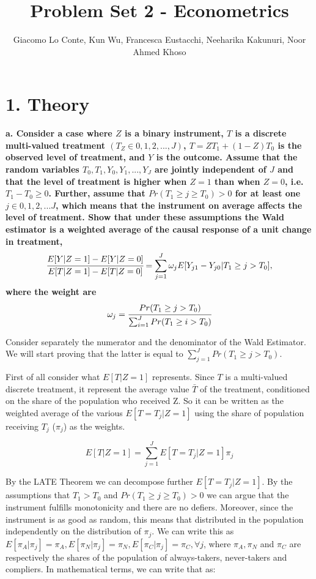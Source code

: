\documentclass[a4paper,12pt,oneside,English]{article}
\title{Problem Set 2 - Econometrics}
\author{ Giacomo Lo Conte, Kun Wu, Francesca Eustacchi, Neeharika Kakunuri, Noor Ahmed Khoso }
\begin{document}
\maketitle
\section{1. Theory}
\textbf{a. Consider a case where $Z$ is a binary instrument, $T$ is a discrete multi-valued treatment $(T_Z \in {0,1,2,...,J})$, $T = Z T_1 + (1 - Z)T_0$ is the observed level of treatment, and $Y$ is the outcome. Assume that the random variables $T_0, T_1, Y_0, Y_1, . . . , Y_J$ are jointly independent of $J$ and that the level of treatment is higher when $Z = 1$ than when $Z = 0$, i.e. $T_1 - T_0 \geq 0$. Further, assume that $Pr(T_1 \geq j \geq T_0) > 0$ for at least one $j \in {0,1,2,...J}$, which means that the instrument on average affects the level of treatment. Show that under these assumptions the Wald estimator is a weighted average of the causal response of a unit change in treatment,}
\begin{equation}
    \cfrac{E[Y| Z = 1] - E[Y | Z = 0]}{E[T| Z = 1] - E[T| Z = 0]} = \sum^J_{j=1} \omega_j  E[Y_{j1} - Y_{j0}|T_1 \geq j > T_0],
\end{equation}
\textbf{where the weight are }
\begin{equation}
\omega_j = \cfrac{Pr(T_1\geq j > T_0)}{\sum^J_{i=1}Pr(T_1\geq i > T_0)}
\end{equation}

Consider separately the numerator and the denominator of the Wald Estimator. We will start proving that the latter is equal to $\sum_{j=1}^J Pr(T_1\geq j>T_0)$.

First of all consider what $E[T|Z=1]$ represents. Since $T$ is a multi-valued discrete treatment, it represent the average value $\bar T$ of the treatment, conditioned on the share of the population who received Z. So it can be written as the weighted average of the various $E[T=T_j|Z=1]$ using the share of population receiving $T_j$ ($\pi_j$) as the weights.

\[
E[T|Z=1]=\sum_{j=1}^J E[T=T_j|Z=1] \pi_j
\]

By the LATE Theorem we can decompose further $E[T=T_j|Z=1]$. By the assumptions that $T_1>T_0$ and $Pr(T_1 \geq j \geq T_0) > 0$ we can argue that the instrument fulfills monotonicity and there are no defiers. Moreover, since the instrument is as good as random, this means that distributed in the population independently on the distribution of $\pi_j$. We can write this as $E[\pi_A|\pi_j]=\pi_A,E[\pi_N|\pi_j]=\pi_N,E[\pi_C|\pi_j]=\pi_C,\forall j$, where $\pi_A, \pi_N$ and $\pi_C$ are respectively the shares of the population of always-takers, never-takers and compliers. In mathematical terms, we can write that as:
\end{document}
